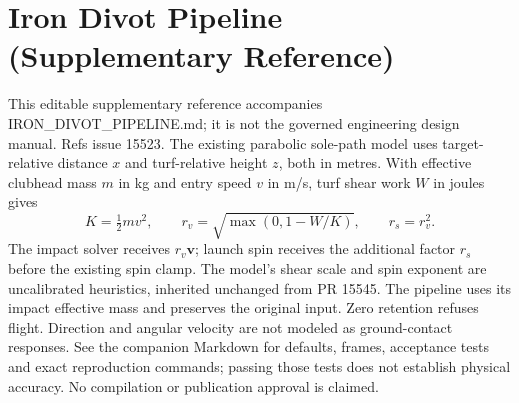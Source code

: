 \documentclass{article}
\begin{document}
\section*{Iron Divot Pipeline (Supplementary Reference)}
This editable supplementary reference accompanies IRON\_DIVOT\_PIPELINE.md;
it is not the governed engineering design manual. Refs issue 15523.
The existing parabolic sole-path model uses target-relative distance $x$
and turf-relative height $z$, both in metres. With effective clubhead mass
$m$ in kg and entry speed $v$ in m/s, turf shear work $W$ in joules gives
\[
 K=\tfrac12 mv^2,\qquad r_v=\sqrt{\max(0,1-W/K)},\qquad r_s=r_v^2.
\]
The impact solver receives $r_v\mathbf v$; launch spin receives the additional
factor $r_s$ before the existing spin clamp. The model's shear scale and
spin exponent are uncalibrated heuristics, inherited unchanged from PR 15545.
The pipeline uses its impact effective mass and preserves the original input.
Zero retention refuses flight. Direction and angular velocity are not modeled
as ground-contact responses. See the companion Markdown for defaults, frames,
acceptance tests and exact reproduction commands; passing those tests does
not establish physical accuracy. No compilation or publication approval is claimed.
\end{document}
